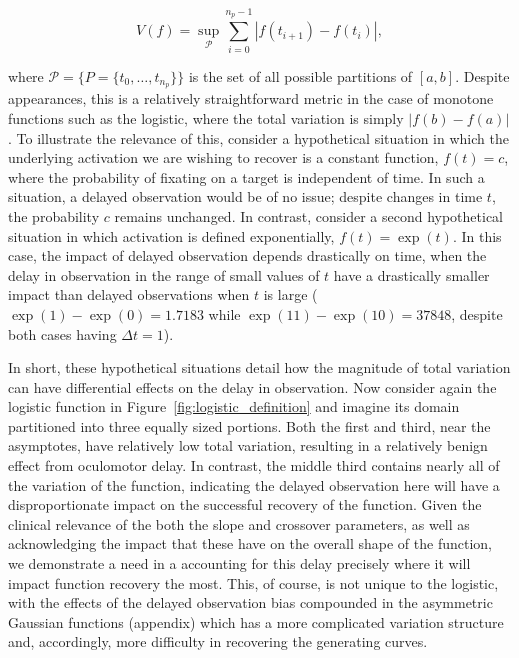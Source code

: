 \begin{equation}
V(f) = \underset{\mathcal{P}}{\sup} \sum_{i=0}^{n_p-1} \left|f(t_{i+1}) - f(t_i) \right|,
\end{equation}

where $\mathcal{P} = \{P = \{t_0, \dots, t_{n_p}\} \}$ is the set of all possible partitions of $[a,b]$. Despite appearances, this is a relatively straightforward metric in the case of monotone functions such as the logistic, where the total variation is simply $|f(b) - f(a)|$. To illustrate the relevance of this, consider a hypothetical situation in which the underlying activation we are wishing to recover is a constant function, $f(t) = c$, where the probability of fixating on a target is independent of time. In such a situation, a delayed observation would be of no issue; despite changes in time $t$, the probability $c$ remains unchanged. In contrast, consider a second hypothetical situation in which activation is defined exponentially, $f(t) = \exp(t)$. In this case, the impact of delayed observation depends drastically on time, when the delay in observation in the range of small values of $t$ have a drastically smaller impact than delayed observations when $t$ is large ($\exp(1) - \exp(0) = 1.7183$ while $\exp(11) - \exp(10) = 37848$, despite both cases having $\Delta t = 1$).

In short, these hypothetical situations detail how the magnitude of total variation can have differential effects on the delay in observation. Now consider again the logistic function in Figure~\ref{fig:logistic_definition} and imagine its domain partitioned into three equally sized portions. Both the first and third, near the asymptotes, have relatively low total variation, resulting in a relatively benign effect from oculomotor delay. In contrast, the middle third contains nearly all of the variation of the function, indicating the delayed observation here will have a disproportionate impact on the successful recovery of the function. Given the clinical relevance of the both the slope and crossover parameters, as well as acknowledging the impact that these have on the overall shape of the function, we demonstrate a need in a accounting for this delay precisely where it will impact function recovery the most. This, of course, is not unique to the logistic, with the effects of the delayed observation bias compounded in the asymmetric Gaussian functions (appendix) which has a more complicated variation structure and, accordingly, more difficulty in recovering the generating curves.








